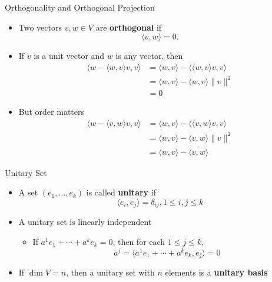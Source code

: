 \documentclass[usenames,dvipsnames,10pt]{beamer}
\begin{document}
\begin{frame}
  {Orthogonality and Orthogonal Projection}

  \begin{itemize}
  \item Two vectors $v, w \in V$ are {\bf orthogonal} if
    \[
      \langle v, w\rangle = 0.
    \]
  \item If $v$ is a unit vector and $w$ is any vector, then
    \begin{align*}
      \langle w - \langle w,v\rangle v, v\rangle &= \langle w,v\rangle - \langle \langle w,v\rangle v,v\rangle\\
                                                 &= \langle w,v\rangle - \langle w,v\rangle \|v\|^2\\
                                                 &= 0
    \end{align*}
  \item But order matters
    \begin{align*}
      \langle w - \langle v,w\rangle v, v\rangle &= \langle w,v\rangle - \langle \langle v,w\rangle v,v\rangle\\
                                                 &= \langle w,v\rangle - \langle v,w\rangle \|v\|^2\\
                                                 &= \langle w,v\rangle - \overline{\langle v,w\rangle}
    \end{align*}
  \end{itemize}
\end{frame}

\begin{frame}
  {Unitary Set}

  \begin{itemize}
  \item A set $(e_1, \dots, e_k)$ is called {\bf unitary} if
    \[
      \langle e_i,e_j\rangle = \delta_{ij}, 1 \le i, j \le k
    \]
  \item A unitary set is linearly independent
    \begin{itemize}
    \item If $a^1e_1 + \cdots + a^ke_k = 0$, then for each $1 \le j \le k$,
      \[
        a^j = \langle a^1e_1 + \cdots + a^ke_k, e_j\rangle = 0
      \]
    \end{itemize}
  \item If $\dim V = n$, then a unitary set with $n$ elements is a {\bf unitary basis}
  \end{itemize}
\end{frame}
\end{document}
